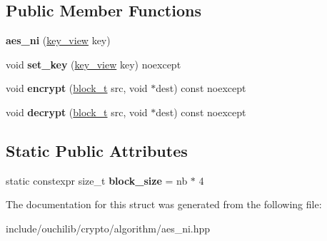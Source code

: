 \subsection*{Public Member Functions}
\begin{DoxyCompactItemize}
\item 
\mbox{\label{structouchi_1_1crypto_1_1aes__ni_acb5af116a711b0edb24176ad95d24f2e}} 
{\bfseries aes\+\_\+ni} (\mbox{\hyperlink{classouchi_1_1crypto_1_1memory__view}{key\+\_\+view}} key)
\item 
\mbox{\label{structouchi_1_1crypto_1_1aes__ni_abbd05e01784e705b973e76de562f010a}} 
void {\bfseries set\+\_\+key} (\mbox{\hyperlink{classouchi_1_1crypto_1_1memory__view}{key\+\_\+view}} key) noexcept
\item 
\mbox{\label{structouchi_1_1crypto_1_1aes__ni_a064761766865db0ff8ed362fba347a6c}} 
void {\bfseries encrypt} (\mbox{\hyperlink{classouchi_1_1crypto_1_1memory__view}{block\+\_\+t}} src, void $\ast$dest) const noexcept
\item 
\mbox{\label{structouchi_1_1crypto_1_1aes__ni_afad0cf6eabf0706f98faf8913fcbb809}} 
void {\bfseries decrypt} (\mbox{\hyperlink{classouchi_1_1crypto_1_1memory__view}{block\+\_\+t}} src, void $\ast$dest) const noexcept
\end{DoxyCompactItemize}
\subsection*{Static Public Attributes}
\begin{DoxyCompactItemize}
\item 
\mbox{\label{structouchi_1_1crypto_1_1aes__ni_ab969cfd1594842c81a1a5d6b44402ffb}} 
static constexpr size\+\_\+t {\bfseries block\+\_\+size} = nb $\ast$ 4
\end{DoxyCompactItemize}


The documentation for this struct was generated from the following file\+:\begin{DoxyCompactItemize}
\item 
include/ouchilib/crypto/algorithm/aes\+\_\+ni.\+hpp\end{DoxyCompactItemize}
